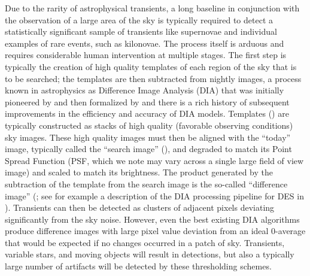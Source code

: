 Due to the rarity of astrophysical transients, a long baseline in conjunction with the observation of a large area of the sky is typically required to detect a statistically significant sample of transients like supernovae and individual examples of rare events, such as kilonovae.  The process itself is arduous and requires considerable human intervention at multiple stages. The first step is typically the creation of high quality templates of each region of the sky that is to be searched; the templates are then subtracted from nightly images, a process known in astrophysics as Difference Image Analysis (DIA) that was initially pioneered by \cite{Tomaney_1996} and then formalized by \cite{Alard_1998} and there is a rich history of subsequent improvements in the efficiency and accuracy of DIA models. Templates  (\temp) are typically constructed as stacks of high quality (favorable observing conditions) sky images. These high quality images must then be aligned with the ``today'' image, typically called the ``search image'' (\search), and degraded to match its Point Spread Function (PSF, which we note may vary across a single large field of view image) and scaled to match its brightness. The product generated by the subtraction of the template from the search image is the so-called ``difference image''   (\diff; see for example a description of the DIA processing pipeline for DES in \citealt{Kessler_2015}).
Transients can then be detected as clusters of adjacent pixels deviating significantly from the sky noise.
However, even the best existing DIA algorithms produce difference images with large pixel value deviation from an ideal 0-average that would be expected if no changes occurred in a patch of sky. Transients, variable stars, and moving objects will result in detections, but also a typically large number of artifacts will be detected by these thresholding schemes.

